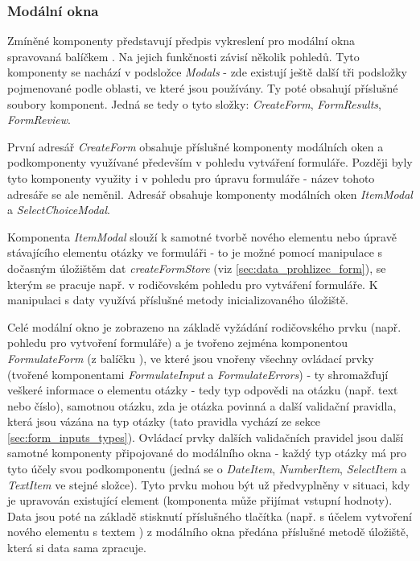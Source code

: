 		\subsubsection{Modální okna} %
		Zmíněné komponenty představují předpis vykreslení pro modální okna spravovaná balíčkem . Na jejich funkčnosti závisí několik pohledů. Tyto komponenty se nachází v podsložce \textit{Modals} - zde existují ještě další tři podsložky pojmenované podle oblasti, ve které jsou používány. Ty poté obsahují příslušné soubory komponent. Jedná se tedy o tyto složky: \textit{CreateForm}, \textit{FormResults}, \textit{FormReview}. 
		
			První adresář \textit{CreateForm} obsahuje příslušné komponenty modálních oken a podkomponenty využívané především v pohledu vytváření formuláře. Později byly tyto komponenty využity i v pohledu pro úpravu formuláře - název tohoto adresáře se ale neměnil. Adresář obsahuje komponenty modálních oken \textit{ItemModal} a \textit{SelectChoiceModal}.
			
			Komponenta \textit{ItemModal} slouží k samotné tvorbě nového elementu nebo úpravě stávajícího elementu otázky ve formuláři - to je možné pomocí manipulace s dočasným úložištěm dat \textit{createFormStore} (viz \ref{sec:data_prohlizec_form}), se kterým se pracuje např. v rodičovském pohledu pro vytváření formuláře. K manipulaci s daty využívá příslušné metody inicializovaného úložiště.
			
			Celé modální okno je zobrazeno na základě vyžádání rodičovského prvku (např. pohledu pro vytvoření formuláře) a je tvořeno zejména komponentou \textit{FormulateForm} (z balíčku ), ve které jsou vnořeny všechny ovládací prvky (tvořené komponentami \textit{FormulateInput} a \textit{FormulateErrors}) - ty shromažďují veškeré informace o elementu otázky - tedy typ odpovědi na otázku (např. text nebo číslo), samotnou otázku, zda je otázka povinná a další validační pravidla, která jsou vázána na typ otázky (tato pravidla vychází ze sekce \ref{sec:form_inputs_types}). Ovládací prvky dalších validačních pravidel jsou další samotné komponenty připojované do modálního okna - každý typ otázky má pro tyto účely svou podkomponentu (jedná se o \textit{DateItem}, \textit{NumberItem}, \textit{SelectItem} a \textit{TextItem} ve stejné složce). Tyto prvku mohou být už předvyplněny v situaci, kdy je upravován existující element (komponenta může přijímat vstupní hodnoty). Data jsou poté na základě stisknutí příslušného tlačítka (např. s účelem vytvoření nového elementu s textem ) z modálního okna předána příslušné metodě úložiště, která si data sama zpracuje.
			
